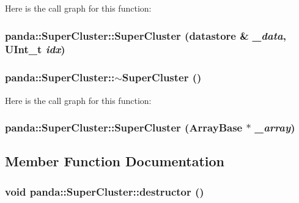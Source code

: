 Here is the call graph for this function:\hypertarget{classpanda_1_1SuperCluster_a4de174946da9eabb94b7df435e38f13b}{
\subsubsection[{SuperCluster}]{\setlength{\rightskip}{0pt plus 5cm}panda::SuperCluster::SuperCluster ({\bf datastore} \& {\em \_\-data}, \/  UInt\_\-t {\em idx})}}
\label{classpanda_1_1SuperCluster_a4de174946da9eabb94b7df435e38f13b}
\hypertarget{classpanda_1_1SuperCluster_a5d68a5bc03396312aa59fb40ecaa7ddf}{
\subsubsection[{$\sim$SuperCluster}]{\setlength{\rightskip}{0pt plus 5cm}panda::SuperCluster::$\sim$SuperCluster ()}}
\label{classpanda_1_1SuperCluster_a5d68a5bc03396312aa59fb40ecaa7ddf}


Here is the call graph for this function:\hypertarget{classpanda_1_1SuperCluster_a07566c266f4073b8045fb5fa3ee2ad17}{
\subsubsection[{SuperCluster}]{\setlength{\rightskip}{0pt plus 5cm}panda::SuperCluster::SuperCluster ({\bf ArrayBase} $\ast$ {\em \_\-array})}}
\label{classpanda_1_1SuperCluster_a07566c266f4073b8045fb5fa3ee2ad17}


\subsection{Member Function Documentation}
\hypertarget{classpanda_1_1SuperCluster_aaa4fb78fe99ff655b1a25f0e1081f2ac}{
\subsubsection[{destructor}]{\setlength{\rightskip}{0pt plus 5cm}void panda::SuperCluster::destructor ()}}
\label{classpanda_1_1SuperCluster_aaa4fb78fe99ff655b1a25f0e1081f2ac}


